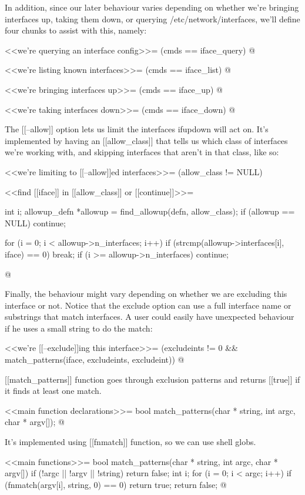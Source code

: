 \documentclass{article}
\begin{document}
In addition, since our later behaviour varies depending on whether we're
bringing interfaces up, taking them down, or querying /etc/network/interfaces,
we'll define four chunks to assist with this, namely:

<<we're querying an interface config>>=
(cmds == iface_query)
@

<<we're listing known interfaces>>=
(cmds == iface_list)
@

<<we're bringing interfaces up>>=
(cmds == iface_up)
@

<<we're taking interfaces down>>=
(cmds == iface_down)
@

The [[--allow]] option lets us limit the interfaces ifupdown will act on.
It's implemented by having an [[allow_class]] that tells us which class
of interfaces we're working with, and skipping interfaces that aren't
in that class, like so:

<<we're limiting to [[--allow]]ed interfaces>>=
(allow_class != NULL)

<<find [[iface]] in [[allow_class]] or [[continue]]>>=
{
	int i;
	allowup_defn *allowup = find_allowup(defn, allow_class);
	if (allowup == NULL)
		continue;

	for (i = 0; i < allowup->n_interfaces; i++) {
		if (strcmp(allowup->interfaces[i], iface) == 0)
			break;
	}
	if (i >= allowup->n_interfaces)
		continue;
}
@

Finally, the behaviour might vary depending on whether we are 
excluding this interface or not. Notice that
the exclude option can use a full interface name or substrings that
match interfaces. A user could easily have unexpected behaviour
if he uses a small string to do the match:

<<we're [[--exclude]]ing this interface>>=
(excludeints != 0 && match_patterns(iface, excludeints, excludeint))
@

[[match_patterns]] function goes through exclusion patterns and returns [[true]] if it finds at least one match.

<<main function declarations>>=
bool match_patterns(char * string, int argc, char * argv[]);
@

It's implemented using [[fnmatch]] function, so we can use shell globs.

<<main functions>>=
bool match_patterns(char * string, int argc, char * argv[]) {
	if (!argc || !argv || !string) return false;
	int i;
	for (i = 0; i < argc; i++) {
		if (fnmatch(argv[i], string, 0) == 0) {
			return true;
		}
	}
	return false;
}
@
\end{document}
